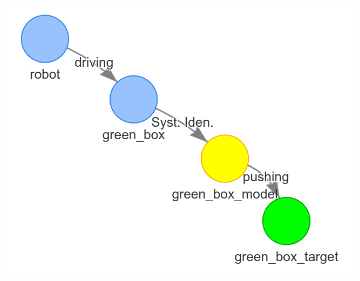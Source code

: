 \begin{figure}[H]
\begin{subfigure}{.3\textwidth}
    \includegraphics[width=1.1\textwidth]{figures/connecting_nodes/robot_push_3}
    \caption{}\label{subfig:robot_push_3}
    \end{subfigure}


\end{figure}
